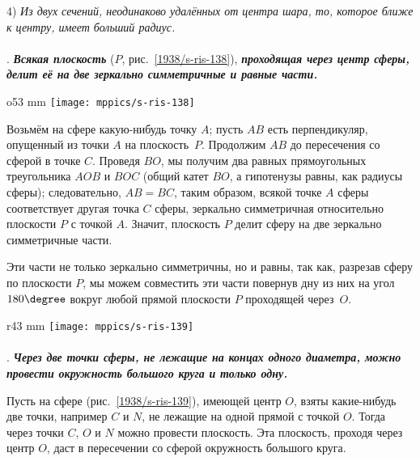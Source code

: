 4) \emph{Из двух сечений, неодинаково удалённых от центра шара, то, которое ближе к центру, имеет больший радиус.}

\paragraph{}\label{1938/s128}
.
\textbf{\emph{Всякая плоскость}} ($P$, рис.~\ref{1938/s-ris-138}), \textbf{\emph{проходящая через центр сферы, делит её на две зеркально симметричные и равные части.}}

\begin{wrapfigure}{o}{53 mm}
\vskip-0mm
\centering
\texttt{[image: mppics/s-ris-138]}
\caption{}\label{1938/s-ris-138}
\vskip-0mm
\end{wrapfigure}

Возьмём на сфере какую-нибудь точку $A$;
пусть $AB$ есть перпендикуляр, опущенный из точки $A$ на плоскость~$P$.
Продолжим $AB$ до пересечения со сферой в точке $C$.
Проведя $BO$, мы получим два равных прямоугольных треугольника $AOB$ и $BOC$ (общий катет $BO$, а гипотенузы равны, как радиусы сферы);
следовательно, $AB=BC$, таким образом, всякой точке $A$ сферы соответствует другая точка $C$ сферы, зеркально симметричная относительно плоскости $P$ с точкой $A$.
Значит, плоскость $P$ делит сферу на две зеркально симметричные части.

Эти части не только зеркально симметричны, но и равны, так как, разрезав сферу по плоскости $P$, мы можем совместить эти части повернув дну из них на угол $180\degree$ вокруг любой прямой плоскости $P$ проходящей через~$O$.

\begin{wrapfigure}[9]{r}{43 mm}
\vskip-8mm
\centering
\texttt{[image: mppics/s-ris-139]}
\caption{}\label{1938/s-ris-139}
\vskip-0mm
\end{wrapfigure}

\paragraph{}\label{1938/s129}
\mbox{.}
\textbf{\emph{Через две точки сферы, не лежащие на концах одного диаметра, можно провести окружность большого круга и только одну.}}

Пусть на сфере (рис.~\ref{1938/s-ris-139}), имеющей центр $O$, взяты какие-нибудь две точки, например $C$ и $N$, не лежащие на одной прямой с точкой $O$.
Тогда через точки $C$, $O$ и $N$ можно провести плоскость.
Эта плоскость, проходя через центр $O$, даст в пересечении со сферой окружность большого круга.

